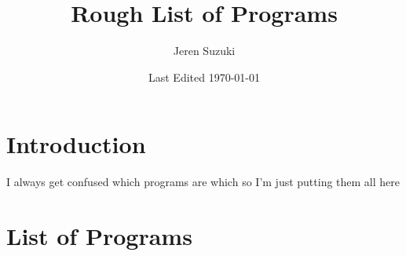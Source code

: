 \documentclass[10pt]{article}
\title{Rough List of Programs}
\author{Jeren Suzuki}
\date{Last Edited \today}
\begin{document}
\maketitle
{}
\tableofcontents
{}
\clearpage
{}

\section*{Introduction} %
\label{sec:introduction}
I always get confused which programs are which so I'm just putting them all here

\section{List of Programs} %
\label{sec:list_of_programs}
\end{document}
